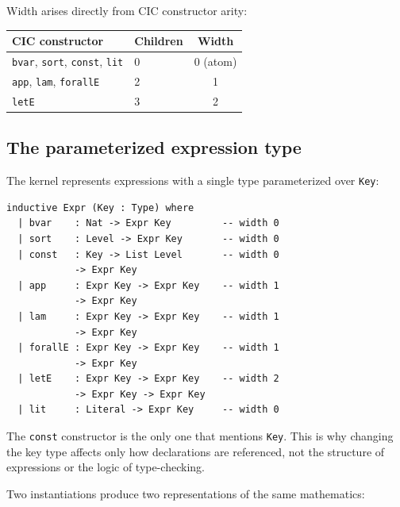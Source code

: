 Width arises directly from CIC constructor arity:

\begin{center}\small
\begin{tabular}{@{}llc@{}}
\toprule
CIC constructor & Children & Width \\
\midrule
\texttt{bvar}, \texttt{sort}, \texttt{const}, \texttt{lit} & 0 & 0 (atom) \\
\texttt{app}, \texttt{lam}, \texttt{forallE} & 2 & 1 \\
\texttt{letE} & 3 & 2 \\
\bottomrule
\end{tabular}
\end{center}

\subsection{The parameterized expression type}\label{sec:expr}

The kernel represents expressions with a single type parameterized over \texttt{Key}:

\begin{lstlisting}[language={},morekeywords={inductive,where,deriving}]
inductive Expr (Key : Type) where
  | bvar    : Nat -> Expr Key         -- width 0
  | sort    : Level -> Expr Key       -- width 0
  | const   : Key -> List Level       -- width 0
            -> Expr Key
  | app     : Expr Key -> Expr Key    -- width 1
            -> Expr Key
  | lam     : Expr Key -> Expr Key    -- width 1
            -> Expr Key
  | forallE : Expr Key -> Expr Key    -- width 1
            -> Expr Key
  | letE    : Expr Key -> Expr Key    -- width 2
            -> Expr Key -> Expr Key
  | lit     : Literal -> Expr Key     -- width 0
\end{lstlisting}

The \texttt{const} constructor is the only one that mentions \texttt{Key}.  This is why changing the key type affects only how declarations are referenced, not the structure of expressions or the logic of type-checking.

Two instantiations produce two representations of the same mathematics:

